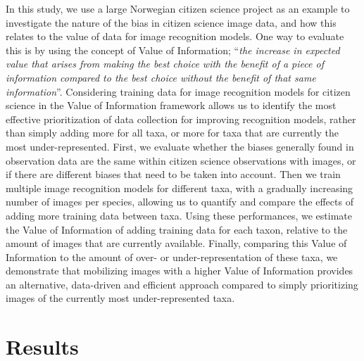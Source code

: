 \documentclass{article}
\begin{document}
In this study, we use a large Norwegian citizen science project as an example to investigate the nature of the bias in citizen science image data, and how this relates to the value of data for image recognition models. One way to evaluate this is by using the concept of Value of Information; ``\textit{the increase in expected value that arises from making the best choice with the benefit of a piece of information compared to the best choice without the benefit of that same information}''\autocite{Keisler2013}. Considering training data for image recognition models for citizen science in the Value of Information framework allows us to identify the most effective prioritization of data collection for improving recognition models, rather than simply adding more for all taxa, or more for taxa that are currently the most under-represented. First, we evaluate whether the biases generally found in observation data are the same within citizen science observations with images, or if there are different biases that need to be taken into account. Then we train multiple image recognition models for different taxa, with a gradually increasing number of images per species, allowing us to quantify and compare the effects of adding more training data between taxa. Using these performances, we estimate the Value of Information of adding training data for each taxon, relative to the amount of images that are currently available. Finally, comparing this Value of Information to the amount of over- or under-representation of these taxa, we demonstrate that mobilizing images with a higher Value of Information provides an alternative, data-driven and efficient approach compared to simply prioritizing images of the currently most under-represented taxa.


\section*{Results}
\end{document}
